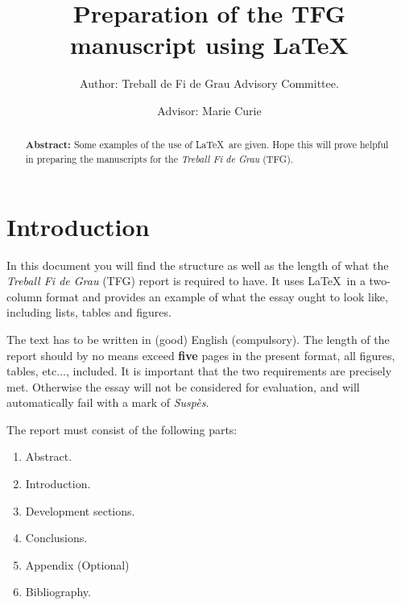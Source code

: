 \documentclass[twocolumn]{revtex4}
\begin{document}


\pagestyle{fancy}


\title{Preparation of the TFG manuscript
using \LaTeX}
\author{Author: Treball de Fi de Grau Advisory Committee.}
\author{Advisor: Marie Curie}

\begin{abstract}
{\bf Abstract:} Some examples of the use of \LaTeX\ are given. Hope
this will prove
helpful in preparing the manuscripts for the {\it Treball Fi de Grau}
(TFG).
\end{abstract}

\maketitle


\section{Introduction}
In this document you will find the structure as well as the length
of what the {\it Treball Fi de Grau} (TFG) report is
required to have. It uses
\LaTeX\ in a two-column format and provides an example of what the essay
ought to look like, including lists, tables and figures.

The text has to be written in (good) English (compulsory).
The length of the report should by no means exceed {\bf five} pages in the
present format,
all figures, tables, etc..., included. It is important that the
two requirements are precisely met. Otherwise the essay will not be
considered for evaluation, and will automatically fail with
a mark of {\it Susp\`es}.

The report must consist of the following parts:
\begin{enumerate}
\item Abstract.
\item Introduction.
\item Development sections.
\item Conclusions.
\item Appendix (Optional)
\item Bibliography.
\end{enumerate}
\end{document}
